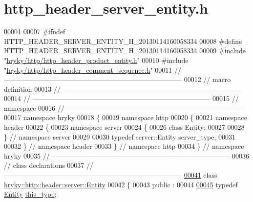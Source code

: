 \hypertarget{http__header__server__entity_8h_source}{\section{http\-\_\-header\-\_\-server\-\_\-entity.\-h}
}

\begin{DoxyCode}
00001 
00007 \textcolor{preprocessor}{#ifndef HTTP\_HEADER\_SERVER\_ENTITY\_H\_20130114160058334}
00008 \textcolor{preprocessor}{}\textcolor{preprocessor}{#define HTTP\_HEADER\_SERVER\_ENTITY\_H\_20130114160058334}
00009 \textcolor{preprocessor}{}\textcolor{preprocessor}{#include "\hyperlink{http__header__product__entity_8h}{hryky/http/http_header_product_entity.h}"}
00010 \textcolor{preprocessor}{#include "\hyperlink{http__header__comment__sequence_8h}{hryky/http/http_header_comment_sequence.h}"}
00011 \textcolor{comment}{//
      ------------------------------------------------------------------------------}
00012 \textcolor{comment}{// macro definition}
00013 \textcolor{comment}{//
      ------------------------------------------------------------------------------}
00014 \textcolor{comment}{//
      ------------------------------------------------------------------------------}
00015 \textcolor{comment}{// namespace}
00016 \textcolor{comment}{//
      ------------------------------------------------------------------------------}
00017 \textcolor{keyword}{namespace }hryky
00018 \{
00019 \textcolor{keyword}{namespace }http
00020 \{
00021 \textcolor{keyword}{namespace }header
00022 \{
00023 \textcolor{keyword}{namespace }server
00024 \{
00026     \textcolor{keyword}{class }Entity;
00027 
00028 \} \textcolor{comment}{// namespace server}
00029 
00030 \textcolor{keyword}{typedef} server::Entity server\_type;
00031 
00032 \} \textcolor{comment}{// namespace header}
00033 \} \textcolor{comment}{// namespace http}
00034 \} \textcolor{comment}{// namespace hryky}
00035 \textcolor{comment}{//
      ------------------------------------------------------------------------------}
00036 \textcolor{comment}{// class declarations}
00037 \textcolor{comment}{//
      ------------------------------------------------------------------------------}
\hypertarget{http__header__server__entity_8h_source_l00041}{}\hyperlink{classhryky_1_1http_1_1header_1_1server_1_1_entity}{00041} \textcolor{comment}{}\textcolor{keyword}{class }\hyperlink{classhryky_1_1http_1_1header_1_1server_1_1_entity}{hryky::http::header::server::Entity}
00042 \{
00043 \textcolor{keyword}{public} :
00044 
\hypertarget{http__header__server__entity_8h_source_l00045}{}\hyperlink{classhryky_1_1http_1_1header_1_1server_1_1_entity_a0009d4111326ee03ac700834367f90fa}{00045}     \textcolor{keyword}{typedef} \hyperlink{classhryky_1_1http_1_1header_1_1server_1_1_entity}{Entity} \hyperlink{classhryky_1_1http_1_1header_1_1server_1_1_entity_a0009d4111326ee03ac700834367f90fa}{this_type};

\end{DoxyCode}

